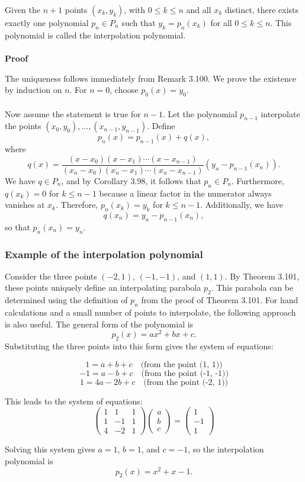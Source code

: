 Given the \(n+1\) points \((x_k, y_k)\), with \(0 \leq k \leq n\) and all \(x_k\) distinct, there exists exactly one polynomial \(p_n \in P_n\) such that \(y_k = p_n(x_k)\) for all \(0 \leq k \leq n\). This polynomial is called the interpolation polynomial.
\\\\
\textbf{Proof}

The uniqueness follows immediately from Remark 3.100. We prove the existence by induction on \(n\). For \(n = 0\), choose \(p_0(x) = y_0\). 
\\\\
Now assume the statement is true for \(n-1\). Let the polynomial \(p_{n-1}\) interpolate the points \((x_0, y_0), \ldots, (x_{n-1}, y_{n-1})\). Define
\[
p_n(x) = p_{n-1}(x) + q(x),
\]
where
\[
q(x) = \frac{(x - x_0)(x - x_1)\cdots(x - x_{n-1})}{(x_n - x_0)(x_n - x_1)\cdots(x_n - x_{n-1})} (y_n - p_{n-1}(x_n)).
\]
We have \(q \in P_n\), and by Corollary 3.98, it follows that \(p_n \in P_n\). Furthermore, \(q(x_k) = 0\) for \(k \leq n-1\) because a linear factor in the numerator always vanishes at \(x_k\). Therefore, \(p_n(x_k) = y_k\) for \(k \leq n-1\). Additionally, we have
\[
q(x_n) = y_n - p_{n-1}(x_n),
\]
so that \(p_n(x_n) = y_n\). 

\QED

\subsubsection*{Example of the interpolation polynomial}

Consider the three points \((-2, 1)\), \((-1, -1)\), and \((1, 1)\). By Theorem 3.101, these points uniquely define an interpolating parabola \(p_2\). This parabola can be determined using the definition of \(p_n\) from the proof of Theorem 3.101. For hand calculations and a small number of points to interpolate, the following approach is also useful. The general form of the polynomial is 
\[
p_2(x) = ax^2 + bx + c.
\]
Substituting the three points into this form gives the system of equations:

\[
1 = a + b + c \quad \text{(from the point (1, 1))}
\]
\[
-1 = a - b + c \quad \text{(from the point (-1, -1))}
\]
\[
1 = 4a - 2b + c \quad \text{(from the point (-2, 1))}
\]

This leads to the system of equations:
\[
\begin{pmatrix}
1 & 1 & 1 \\
1 & -1 & 1 \\
4 & -2 & 1
\end{pmatrix}
\begin{pmatrix}
a \\
b \\
c
\end{pmatrix}
=
\begin{pmatrix}
1 \\
-1 \\
1
\end{pmatrix}
\]

Solving this system gives \(a = 1\), \(b = 1\), and \(c = -1\), so the interpolation polynomial is
\[
p_2(x) = x^2 + x - 1.
\]

\newpage


